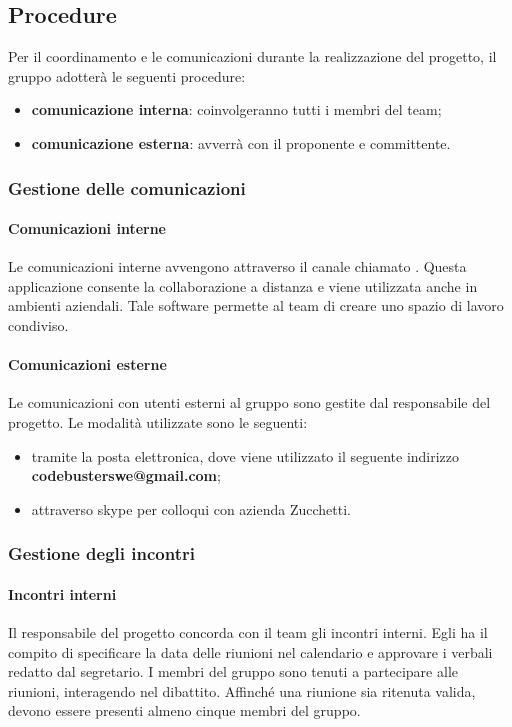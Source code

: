 \subsection{Procedure}
Per il coordinamento e le comunicazioni durante la realizzazione del progetto, il gruppo adotterà le seguenti procedure: 
\begin{itemize}
\item\textbf{comunicazione interna}: coinvolgeranno tutti i membri del team;
\item\textbf{comunicazione esterna}: avverrà con il proponente e committente.
\end{itemize}

\subsubsection{Gestione delle comunicazioni}
\paragraph{Comunicazioni interne}
Le comunicazioni interne avvengono attraverso il canale chiamato . Questa applicazione consente la collaborazione a distanza e viene utilizzata anche in ambienti aziendali. Tale software permette al team di creare uno spazio di lavoro condiviso. \newline \newline

\paragraph{Comunicazioni esterne}
Le comunicazioni con utenti esterni al gruppo sono gestite dal responsabile del progetto. Le modalità utilizzate sono le seguenti: 
\begin{itemize}
\item tramite la posta elettronica, dove viene utilizzato il seguente indirizzo \textbf{codebusterswe@gmail.com}; 
\item attraverso skype per colloqui con azienda Zucchetti.
\end{itemize}

\subsubsection{Gestione degli incontri}
\paragraph{Incontri interni} 
Il responsabile del progetto concorda con il team gli incontri interni. Egli ha il compito di specificare la data delle riunioni nel calendario e approvare i verbali redatto dal segretario. I membri del gruppo sono tenuti a partecipare alle riunioni, interagendo nel dibattito. Affinché una riunione sia ritenuta valida, devono essere presenti almeno cinque membri del gruppo. \newline \newline

